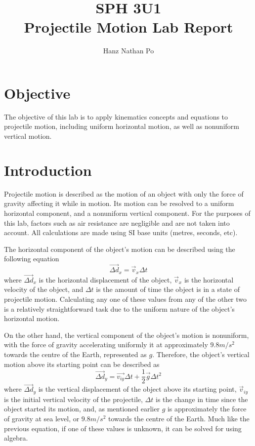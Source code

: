\documentclass[10pt,twocolumn,letterpaper]{article}
\title{
		\usefont{OT1}{bch}{b}{n}
		\normalfont \normalsize \textsc{SPH 3U1} \\ [10pt]
		\huge Projectile Motion Lab Report \\
}
\author[1]{Hanz Nathan Po}
\begin{document}
\maketitle

\section{Objective}
The objective of this lab is to apply kinematics concepts and equations to projectile motion, including uniform horizontal motion, as well as nonuniform vertical motion.

\section{Introduction}
Projectile motion is described as the motion of an object with only the force of gravity affecting it while in motion. Its motion can be resolved to a uniform horizontal component, and a nonuniform vertical component. For the purposes of this lab, factors such as air resistance are negligible and are not taken into account. All calculations are made using SI base units (metres, seconds, etc).

The horizontal component of the object's motion can be described using the following equation
\begin{equation}
    \overrightarrow{\Delta d}_{x}=\overrightarrow{v}_{x}\Delta t
\end{equation}
where \(\overrightarrow{\Delta d}_{x}\) is the horizontal displacement of the object, \(\overrightarrow{v}_{x}\) is the horizontal velocity of the object, and \(\Delta t\) is the amount of time the object is in a state of projectile motion. Calculating any one of these values from any of the other two is a relatively straightforward task due to the uniform nature of the object's horizontal motion. 

On the other hand, the vertical component of the object's motion is nonuniform, with the force of gravity accelerating uniformly it at approximately \(9.8 m/s^2\) towards the centre of the Earth, represented as \(g\). Therefore, the object's vertical motion above its starting point can be described as
\begin{equation}
    \overrightarrow{\Delta d}_{y}=\overrightarrow{v_{iy}}\Delta t+\frac{1}{2}\overrightarrow{g}\Delta t^2
\end{equation}
where \(\overrightarrow{\Delta d}_{y}\) is the vertical displacement of the object above its starting point, \(\overrightarrow{v}_{iy}\) is the initial vertical velocity of the projectile, \(\Delta t\) is the change in time since the object started its motion, and, as mentioned earlier \(g\) is approximately the force of gravity at sea level, or \(9.8 m/s^2\) towards the centre of the Earth. Much like the previous equation, if one of these values is unknown, it can be solved for using algebra. 
\end{document}
